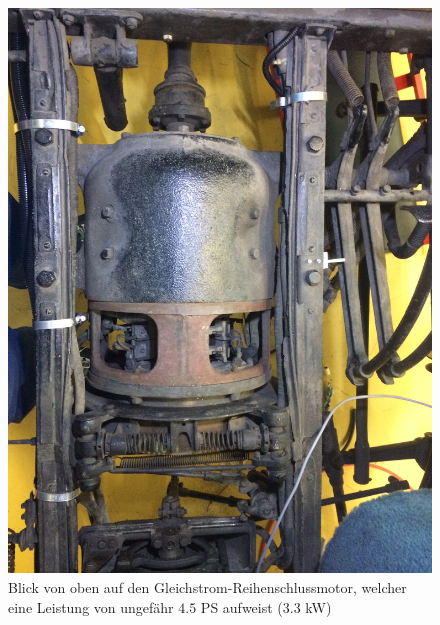 \begin{landscape}
\begin{figure}[h]
		\includegraphics[angle=180,width=1.30\textwidth]{images/Anhang/Motor.jpg}
	\caption{Blick von oben auf den Gleichstrom-Reihenschlussmotor, welcher eine Leistung von ungefähr $4.5$ PS aufweist ($3.3$ kW)}
	\label{fig:Motor}
\end{figure}
\begin{figure}[h]
	\centering

\end{figure}
\end{landscape}
